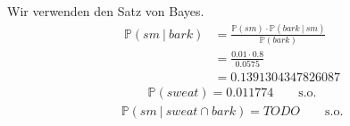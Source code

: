 \documentclass[a4paper]{scrartcl}
\newcommand{\prob}{\mathbb{P}}
\begin{document}
Wir verwenden den Satz von Bayes.
\begin{equation*}
    \begin{split}
        \prob(sm\ |\ bark)
        &= \frac{\prob(sm) \cdot \prob(bark\ |\ sm)}{\prob(bark)} \\
        &= \frac{\num{0,01} \cdot \num{0,8}}{\num{0,0575}} \\
        &= \num{0.1391304347826087}
    \end{split}
\end{equation*}
\begin{equation*}
    \begin{split}
        \prob(sweat) = \num{0.011774}
        \qquad \text{s.o.}
    \end{split}
\end{equation*}
\begin{equation*}
    \begin{split}
        \prob(sm\ |\ sweat \cap bark) = TODO
        \qquad \text{s.o.}
    \end{split}
\end{equation*}
\end{document}
